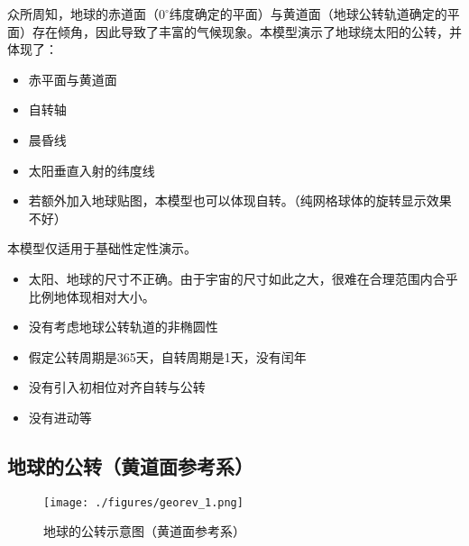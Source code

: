 

众所周知，地球的赤道面（$0 ^\circ$纬度确定的平面）与黄道面（地球公转轨道确定的平面）存在倾角，因此导致了丰富的气候现象。本模型演示了地球绕太阳的公转，并体现了：
\begin{itemize}
\item 赤平面与黄道面
\item 自转轴
\item 晨昏线
\item 太阳垂直入射的纬度线
\item 若额外加入地球贴图，本模型也可以体现自转。（纯网格球体的旋转显示效果不好）
\end{itemize}

本模型仅适用于基础性定性演示。
\begin{itemize}
\item 太阳、地球的尺寸不正确。由于宇宙的尺寸如此之大，很难在合理范围内合乎比例地体现相对大小。
\item 没有考虑地球公转轨道的非椭圆性
\item 假定公转周期是365天，自转周期是1天，没有闰年
\item 没有引入初相位对齐自转与公转
\item 没有进动等
\end{itemize}

\subsection{地球的公转（黄道面参考系）}
\begin{figure}[ht]
\centering
\texttt{[image: ./figures/georev\_1.png]}
\caption{地球的公转示意图（黄道面参考系）} \label{georev_fig1}
\end{figure}

